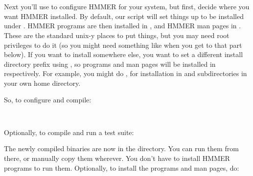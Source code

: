   \vspace{1ex}
  \\
  \\
  \vspace{1ex}

Next you'll use  to configure HMMER for your system,
but first, decide where you want HMMER installed. By default, our
 script will set things up to be installed under
. HMMER programs are then installed in
, and HMMER man pages in
.  These are the standard unix-y
places to put things, but you may need root privileges to do it (so
you might need something like  when you get to
that part below). If you want to install somewhere else, you want to
set a different install directory prefix using , so programs and man pages will be
installed in 
 respectively.  For
example, you might do , for
installation in  and
 subdirectories in your own home
directory.

So, to configure and compile:

  \vspace{1ex}
  \\
  \vspace{1ex}

Optionally, to compile and run a test suite:

  \vspace{1ex}
  \vspace{1ex}

The newly compiled binaries are now in the  directory.  You
can run them from there, or manually copy them wherever.  You don't
have to install HMMER programs to run them. Optionally, to install the
programs and man pages, do:

